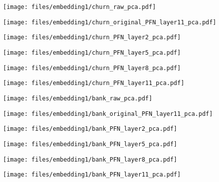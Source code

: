 \begin{figure*}[t]
  \centering
  \vspace{-2mm}
  \begin{minipage}{0.16\linewidth}
    \texttt{[image: files/embedding1/churn\_raw\_pca.pdf]}
    \centering
    \end{minipage}
    \begin{minipage}{0.16\linewidth}
    \texttt{[image: files/embedding1/churn\_original\_PFN\_layer11\_pca.pdf]}
    \centering
    \end{minipage}
    \begin{minipage}{0.16\linewidth}
    \texttt{[image: files/embedding1/churn\_PFN\_layer2\_pca.pdf]}
    \centering
    \end{minipage}
    \begin{minipage}{0.16\linewidth}
    \texttt{[image: files/embedding1/churn\_PFN\_layer5\_pca.pdf]}
    \centering
    \end{minipage}
    \begin{minipage}{0.16\linewidth}
    \texttt{[image: files/embedding1/churn\_PFN\_layer8\_pca.pdf]}
    \centering
    \end{minipage}
    \begin{minipage}{0.16\linewidth}
    \texttt{[image: files/embedding1/churn\_PFN\_layer11\_pca.pdf]}
    \centering
    \end{minipage}

    \begin{minipage}{0.16\linewidth}
    \texttt{[image: files/embedding1/bank\_raw\_pca.pdf]}
    \centering
    \end{minipage}
    \begin{minipage}{0.16\linewidth}
    \texttt{[image: files/embedding1/bank\_original\_PFN\_layer11\_pca.pdf]}
    \centering
    \end{minipage}
    \begin{minipage}{0.16\linewidth}
    \texttt{[image: files/embedding1/bank\_PFN\_layer2\_pca.pdf]}
    \centering
    \end{minipage}
    \begin{minipage}{0.16\linewidth}
    \texttt{[image: files/embedding1/bank\_PFN\_layer5\_pca.pdf]}
    \centering
    \end{minipage}
    \begin{minipage}{0.16\linewidth}
    \texttt{[image: files/embedding1/bank\_PFN\_layer8\_pca.pdf]}
    \centering
    \end{minipage}
    \begin{minipage}{0.16\linewidth}
    \texttt{[image: files/embedding1/bank\_PFN\_layer11\_pca.pdf]}
    \centering
    \end{minipage}


\end{figure*}
